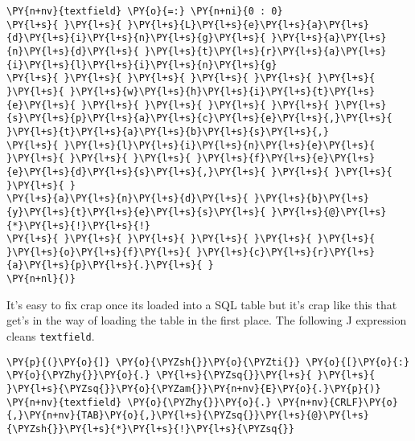     \begin{tcolorbox}[breakable, size=fbox, boxrule=1pt, pad at break*=1mm,colback=cellbackground, colframe=cellborder]
\begin{Verbatim}[commandchars=\\\{\}]
\PY{n+nv}{textfield} \PY{o}{=:} \PY{n+ni}{0 : 0}
\PY{l+s}{ }\PY{l+s}{ }\PY{l+s}{L}\PY{l+s}{e}\PY{l+s}{a}\PY{l+s}{d}\PY{l+s}{i}\PY{l+s}{n}\PY{l+s}{g}\PY{l+s}{ }\PY{l+s}{a}\PY{l+s}{n}\PY{l+s}{d}\PY{l+s}{ }\PY{l+s}{t}\PY{l+s}{r}\PY{l+s}{a}\PY{l+s}{i}\PY{l+s}{l}\PY{l+s}{i}\PY{l+s}{n}\PY{l+s}{g}
\PY{l+s}{ }\PY{l+s}{ }\PY{l+s}{ }\PY{l+s}{ }\PY{l+s}{ }\PY{l+s}{ }\PY{l+s}{ }\PY{l+s}{w}\PY{l+s}{h}\PY{l+s}{i}\PY{l+s}{t}\PY{l+s}{e}\PY{l+s}{ }\PY{l+s}{ }\PY{l+s}{ }\PY{l+s}{ }\PY{l+s}{ }\PY{l+s}{s}\PY{l+s}{p}\PY{l+s}{a}\PY{l+s}{c}\PY{l+s}{e}\PY{l+s}{,}\PY{l+s}{ }\PY{l+s}{t}\PY{l+s}{a}\PY{l+s}{b}\PY{l+s}{s}\PY{l+s}{,}
\PY{l+s}{ }\PY{l+s}{l}\PY{l+s}{i}\PY{l+s}{n}\PY{l+s}{e}\PY{l+s}{ }\PY{l+s}{ }\PY{l+s}{ }\PY{l+s}{ }\PY{l+s}{f}\PY{l+s}{e}\PY{l+s}{e}\PY{l+s}{d}\PY{l+s}{s}\PY{l+s}{,}\PY{l+s}{ }\PY{l+s}{ }\PY{l+s}{ }\PY{l+s}{ }
\PY{l+s}{a}\PY{l+s}{n}\PY{l+s}{d}\PY{l+s}{ }\PY{l+s}{b}\PY{l+s}{y}\PY{l+s}{t}\PY{l+s}{e}\PY{l+s}{s}\PY{l+s}{ }\PY{l+s}{@}\PY{l+s}{*}\PY{l+s}{!}\PY{l+s}{!}
\PY{l+s}{ }\PY{l+s}{ }\PY{l+s}{ }\PY{l+s}{ }\PY{l+s}{ }\PY{l+s}{ }\PY{l+s}{o}\PY{l+s}{f}\PY{l+s}{ }\PY{l+s}{c}\PY{l+s}{r}\PY{l+s}{a}\PY{l+s}{p}\PY{l+s}{.}\PY{l+s}{ }
\PY{n+nl}{)}
\end{Verbatim}
\end{tcolorbox}

    It's easy to fix crap once its loaded into a SQL table but it's crap
like this that get's in the way of loading the table in the first place.
The following J expression cleans \texttt{textfield}.

    \begin{tcolorbox}[breakable, size=fbox, boxrule=1pt, pad at break*=1mm,colback=cellbackground, colframe=cellborder]
\begin{Verbatim}[commandchars=\\\{\}]
\PY{p}{(}\PY{o}{]} \PY{o}{\PYZsh{}}\PY{o}{\PYZti{}} \PY{o}{[}\PY{o}{:} \PY{o}{\PYZhy{}}\PY{o}{.} \PY{l+s}{\PYZsq{}}\PY{l+s}{ }\PY{l+s}{ }\PY{l+s}{\PYZsq{}}\PY{o}{\PYZam{}}\PY{n+nv}{E}\PY{o}{.}\PY{p}{)} \PY{n+nv}{textfield} \PY{o}{\PYZhy{}}\PY{o}{.} \PY{n+nv}{CRLF}\PY{o}{,}\PY{n+nv}{TAB}\PY{o}{,}\PY{l+s}{\PYZsq{}}\PY{l+s}{@}\PY{l+s}{\PYZsh{}}\PY{l+s}{*}\PY{l+s}{!}\PY{l+s}{\PYZsq{}}
\end{Verbatim}
\end{tcolorbox}

